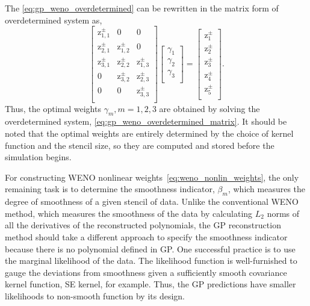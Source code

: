 The \cref{eq:gp_weno_overdetermined} can be rewritten in the matrix form
of overdetermined system as,
\begin{equation}\label{eq:gp_weno_overdetermined_matrix}
    \left[ 
        \begin{array}{ccc}
            {\mathrm{z}_{1,1}^{\pm}}  & 0                       & 0 \\
            {\mathrm{z}_{2,1}^{\pm}}  & \mathrm{z}_{1,2}^{\pm}  & 0 \\
            {\mathrm{z}_{3,1}^{\pm}}  & \mathrm{z}_{2,2}^{\pm}  & \mathrm{z}_{1,3}^{\pm} \\
            0                         & \mathrm{z}_{3,2}^{\pm}  & \mathrm{z}_{2,3}^{\pm} \\
            0                         & 0                       & \mathrm{z}_{3,3}^{\pm} \\
        \end{array}
    \right]
%
\left[
    \begin{array}{c}
        \gamma_1\\
        \gamma_2\\
        \gamma_3\\
    \end{array}
\right]
%
=
%
\left[
    \begin{array}{c}
        {\mathrm{z}_{1}^{\pm}} \\
        {\mathrm{z}_{2}^{\pm}} \\
        {\mathrm{z}_{3}^{\pm}} \\
        {\mathrm{z}_{4}^{\pm}} \\
        {\mathrm{z}_{5}^{\pm}} \\
    \end{array}
\right].
\end{equation}
Thus, the optimal weights \( \gamma_{m}, m = 1, 2, 3 \) are obtained by solving the overdetermined system,
\cref{eq:gp_weno_overdetermined_matrix}. It should be noted that the optimal weights are
entirely determined by the choice of kernel function and the stencil size,
so they are computed and stored before the simulation begins.

For constructing WENO nonlinear weights~\cref{eq:weno_nonlin_weights},
the only remaining task is to determine the smoothness indicator, \( \beta_{m} \),
which measures the degree of smoothness of a given stencil of data.
Unlike the conventional WENO method, which measures the smoothness of the data
by calculating \( L_{2} \) norms of all the derivatives of the reconstructed polynomials,
the GP reconstruction method should take a different approach to specify the smoothness indicator
because there is no polynomial defined in GP\@.
One successful practice is to use the marginal likelihood of the data.
The likelihood function is well-furnished to gauge the deviations from smoothness
given a sufficiently smooth covariance kernel function, SE kernel, for example.
Thus, the GP predictions have smaller likelihoods to non-smooth function by its design.

